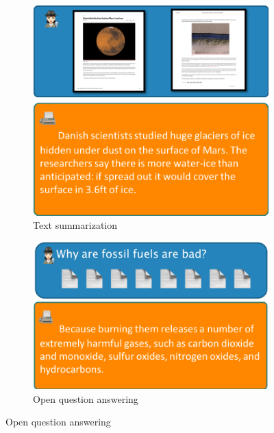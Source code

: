 \begin{figure}[!p]
  \centering
  \begin{subfigure}[b]{.42\textwidth}
    \includegraphics[width=\textwidth]{figures/task_ts}
    \caption{Text summarization}
  \end{subfigure}

  \begin{subfigure}[b]{.42\textwidth}
    \includegraphics[width=\textwidth]{figures/task_oqa}
    \caption{Open question answering}
  \end{subfigure}


\end{figure}

